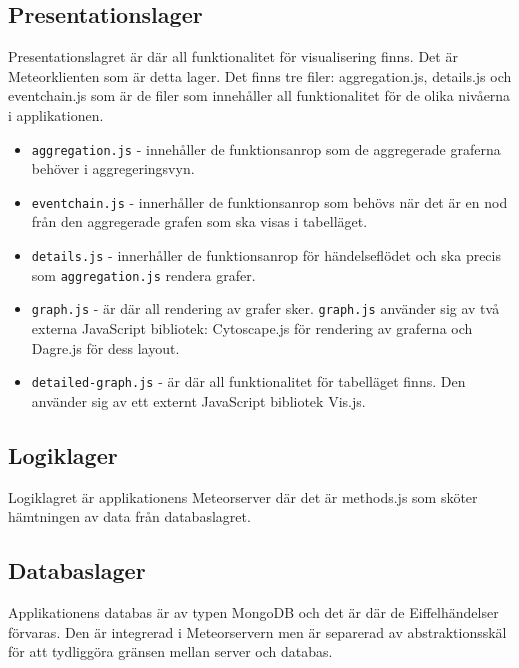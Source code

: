 \subsection{Presentationslager}
Presentationslagret är där all funktionalitet för visualisering finns. Det är Meteorklienten som är detta lager. Det finns tre filer: aggregation.js, details.js och eventchain.js som är de filer som innehåller all funktionalitet för de olika nivåerna i applikationen. \\
\begin{itemize}
  \item \texttt{aggregation.js} - innehåller de funktionsanrop som de aggregerade graferna behöver i aggregeringsvyn.
  \item \texttt{eventchain.js} - innerhåller de funktionsanrop som behövs när det är en nod från den aggregerade grafen som ska visas i tabelläget.
  \item \texttt{details.js} - innerhåller de funktionsanrop för händelseflödet och ska precis som \texttt{aggregation.js} rendera grafer.
  \item \texttt{graph.js} - är där all rendering av grafer sker. \texttt{graph.js} använder sig av två externa JavaScript bibliotek: Cytoscape.js för rendering av graferna och Dagre.js för dess layout.\cite{website:cytoscape}\cite{website:dagre}
  \item \texttt{detailed-graph.js} - är där all funktionalitet för tabelläget finns. Den använder sig av ett externt JavaScript bibliotek Vis.js.\cite{website:vis}
\end{itemize}
\newpage
\subsection{Logiklager}
Logiklagret är applikationens Meteorserver där det är methods.js som sköter hämtningen av data från databaslagret.
\subsection{Databaslager}
Applikationens databas är av typen MongoDB och det är där de Eiffelhändelser förvaras.\cite{website:mongodb} Den är integrerad i Meteorservern men är separerad av abstraktionsskäl för att tydliggöra gränsen mellan server och databas. 
